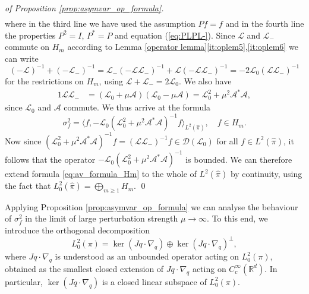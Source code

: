 \begin{proof}[of Proposition \ref{prop:asymvar_op_formula}]
\begin{align*}
	\end{align*}
	where in the third line we have used the assumption $Pf=f$ and in
	the fourth line the properties $P^{2}=I$, $P^{*}=P$ and equation
	(\ref{eq:PLPL-}).   Since $\mathcal{L}$ and $\mathcal{L}_{-}$ commute on $H_m$ according to Lemma
	\ref{operator lemma}\ref{it:oplem5},\ref{it:oplem6} we can write
	\begin{equation*}
	(-\mathcal{L})^{-1}+(-\mathcal{L}_{-})^{-1}  =\mathcal{L}_{-}(-\mathcal{L}\mathcal{L}_{-})^{-1}+\mathcal{L}(-\mathcal{L}\mathcal{L}_{-})^{-1}
	=-2\mathcal{L}_{0}(\mathcal{L}\mathcal{L}_{-})^{-1}
	\end{equation*}
	for the restrictions on $H_m$, 
	using $\mathcal{L}+\mathcal{L}_{-}=2\mathcal{L}_{0}$. We also have
	\begin{alignat*}{1}
	\mathcal{L}\mathcal{L}_{-} & =(\mathcal{L}_{0}+\mu\mathcal{A})(\mathcal{L}_{0}-\mu\mathcal{A}) =\mathcal{L}_{0}^{2}+\mu^{2}\mathcal{A}^{*}\mathcal{A},
	\end{alignat*}
	since $\mathcal{L}_{0}$ and $\mathcal{A}$ commute. We thus arrive at the formula
	\begin{equation}
	\label{eq:av_formula_Hm}
	\sigma_{f}^{2}=\langle f,-\mathcal{L}_{0}(\mathcal{L}_{0}^{2}+\mu^{2}\mathcal{A}^{*}\mathcal{A})^{-1}f\rangle_{L^{2}(\widehat{\pi})}, \quad f\in H_m.
	\end{equation}
	Now since $(\mathcal{L}_{0}^{2}+\mu^{2}\mathcal{A}^{*}\mathcal{A})^{-1}f = (\mathcal{L}\mathcal{L}_{-})^{-1}f \in \mathcal{D}(\mathcal{L}_{0})$ for all $f\in L^2(\widehat{\pi})$, it follows that the operator $-\mathcal{L}_{0}(\mathcal{L}_{0}^{2}+\mu^{2}\mathcal{A}^{*}\mathcal{A})^{-1}$ is bounded. We can therefore extend formula \eqref{eq:av_formula_Hm} to the whole of $L^2(\widehat{\pi})$ by continuity, using the fact that $L^2_0(\widehat{\pi})=\bigoplus_{m\ge 1}H_m$. 
	\qed
\end{proof}
Applying Proposition \ref{prop:asymvar_op_formula} we can analyse the behaviour
of $\sigma_{f}^{2}$ in the limit of large perturbation strength $\mu\rightarrow\infty$.
To this end, we introduce the orthogonal decomposition
\begin{equation}
\label{eq:kernel decomposition}
L_{0}^{2}(\pi)=\ker (Jq\cdot \nabla_q) \oplus\ker (Jq\cdot \nabla_q)^{\perp},
\end{equation}
where $Jq\cdot\nabla_q$ is understood as an unbounded operator acting on $L_0^2(\pi)$, obtained as the smallest closed extension of $Jq\cdot \nabla_q$ acting on $C^{\infty}_c(\mathbb{R}^d)$. In particular, $\ker (Jq\cdot \nabla_q)$ is a closed linear subspace of $L^2_0(\pi)$.   
